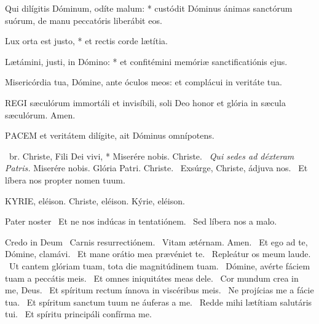 Qui dilígitis Dóminum, odíte malum: * custódit Dóminus ánimas sanctórum suórum, de manu peccatóris liberábit eos.

Lux orta est justo, * et rectis corde lætítia.

Lætámini, justi, in Dómino: * et confitémini memóriæ sanctificatiónis ejus.


 Misericórdia tua, Dómine, ante óculos meos: et complácui in veritáte tua.



\lettrine[lines=2]{R}{EGI} sæculórum immortáli et invisíbili, soli Deo honor et glória in sæcula sæculórum. Amen.



\lettrine[lines=2]{P}{ACEM} et veritátem dilígite, ait Dóminus omnípotens.

\R\ br. Christe, Fili Dei vivi, * Miserére nobis. Christe. \V\ \textit{Qui sedes ad déxteram Patris.} Miserére nobis. Glória Patri. Christe. \V\ Exsúrge, Christe, ádjuva nos. \R\ Et líbera nos propter nomen tuum.


KYRIE, eléison. Christe, eléison. Kýrie, eléison.

Pater noster  \V\ Et ne nos indúcas in tentatiónem. \R\ Sed líbera nos a malo.

Credo in Deum  \V\ Carnis resurrectiónem. \R\ Vitam ætérnam. Amen. \V\ Et ego ad te, Dómine, clamávi. \R\ Et mane orátio mea prævéniet te. \V\ Repleátur os meum laude. \R\ Ut cantem glóriam tuam, tota die magnitúdinem tuam. \V\ Dómine, avérte fáciem tuam a peccátis meis. \R\ Et omnes iniquitátes meas dele. \V\ Cor mundum crea in me, Deus. \R\ Et spíritum rectum ínnova in viscéribus meis. \V\ Ne projícias me a fácie tua. \R\ Et spíritum sanctum tuum ne áuferas a me. \V\ Redde mihi lætítiam salutáris tui. \R\ Et spíritu principáli confírma me.


